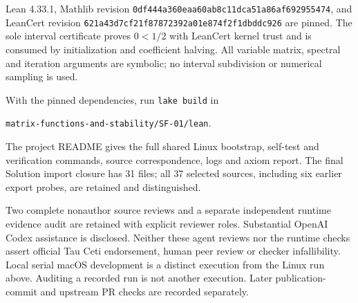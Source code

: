 \documentclass[11pt,a4paper]{article}
\begin{document}
Lean 4.33.1, Mathlib revision
\nolinkurl{0df444a360eaa60ab8c11dca51a86af692955474}, and LeanCert revision
\nolinkurl{621a43d7cf21f87872392a01e874f2f1dbddc926} are pinned.
The sole interval certificate proves $0<1/2$ with LeanCert kernel trust and
is consumed by initialization and coefficient halving. All variable matrix,
spectral and iteration arguments are symbolic; no interval subdivision or
numerical sampling is used.

With the pinned dependencies, run \texttt{lake build} in
\begin{center}\small\nolinkurl{matrix-functions-and-stability/SF-01/lean}.\end{center}
The project README gives the full shared Linux bootstrap, self-test and
verification commands, source correspondence, logs and axiom report.
The final Solution import closure has 31 files; all 37 selected sources,
including six earlier export probes, are retained and distinguished.

Two complete nonauthor source reviews and a separate independent runtime
evidence audit are retained with explicit reviewer roles. Substantial OpenAI
Codex assistance is disclosed. Neither these agent reviews nor the runtime
checks assert official Tau Ceti endorsement, human peer review or checker
infallibility. Local serial macOS development is a distinct execution from
the Linux run above. Auditing a recorded run is not another execution.
Later publication-commit and upstream PR checks are recorded separately.
\end{document}
